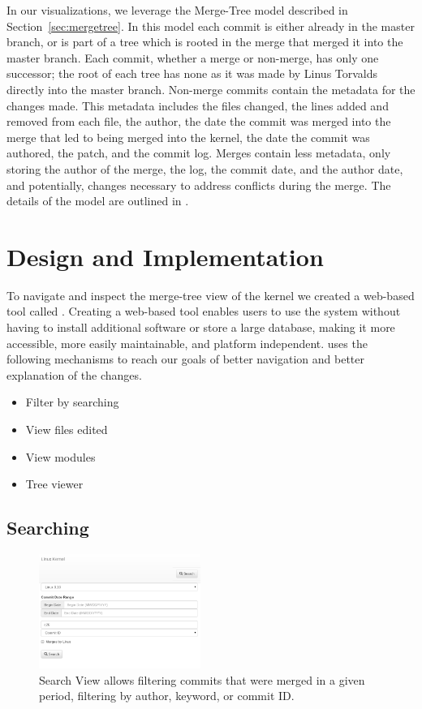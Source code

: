 \documentclass[conference, draftclsnofoot, draft]{IEEEtran}
\begin{document}
In our visualizations, we leverage the Merge-Tree model described in
Section~\ref{sec:mergetree}. In this model each commit is either already in the
master branch, or is part of a tree which is rooted in the merge that merged it into
the master branch.  Each commit, whether a merge or non-merge, has only one
successor; the root of each tree has none as it was made by Linus Torvalds directly
into the master branch. Non-merge commits contain the metadata for the changes made.
This metadata includes the files changed, the lines added and removed from each
file, the author, the date the commit was merged into the merge that led to being
merged into the kernel, the date the commit was authored, the patch, and the commit
log. Merges contain less metadata, only storing the author of the merge, the log,
the commit date, and the author date, and potentially, changes necessary to address
conflicts during the merge. The details of the model are outlined in
\cite{German2015}.

\section{Design and Implementation}

To navigate and inspect the merge-tree view of the kernel we created a web-based
tool called \tool. Creating a web-based tool enables users to use the system without
having to install additional software or store a large database, making it more
accessible, more easily maintainable, and platform independent. \tool uses the
following mechanisms to reach our goals of better navigation and better explanation
of the changes.

\begin{itemize}
        \item Filter by searching
        \item View files edited
        \item View modules
        \item Tree viewer
\end{itemize}

\subsection{Searching}

\begin{figure}
        \centering
        \includegraphics[width=0.47\textwidth]{figures/search.png}
        \caption{Search View allows filtering commits that were merged in a given
                period, filtering by author, keyword, or commit ID.}
        \label{fig:search}
\end{figure}
\end{document}
